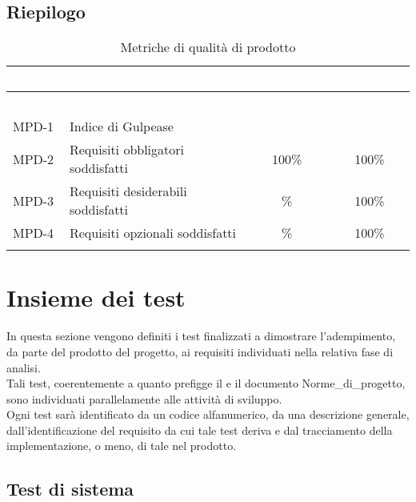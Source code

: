 \subsection{Riepilogo}
{
\setlength{\tabcolsep}{10pt}
\renewcommand{\arraystretch}{1.5}
\begin{xltabular}{\textwidth}{| l | X | c | c |}
    \hline
     \textbf{\textcolor{white}{Codice}} & \textbf{\textcolor{white}{Nome}} & \textbf{\textcolor{white}{Accettabile}} & \textbf{\textcolor{white}{Preferibile}} \\
    \hline
    \endfirsthead
    \hline
     \textbf{\textcolor{white}{Codice}} & \textbf{\textcolor{white}{Nome}} & \textbf{\textcolor{white}{Accettabile}} & \textbf{\textcolor{white}{Preferibile}} \\ 
    \endhead
    MPD-1 & Indice di Gulpease &  &  \\
    \hline
    MPD-2 & Requisiti obbligatori soddisfatti & 100\% & 100\% \\
    \hline
    MPD-3 & Requisiti desiderabili soddisfatti & \% & 100\% \\
    \hline
    MPD-4 & Requisiti opzionali soddisfatti & \% & 100\% \\
    \hline
     \caption{Metriche di qualità di prodotto}
    \label{tab:mpd}
\end{xltabular}
}

\section{Insieme dei test} \label{sec:test}
In questa sezione vengono definiti i test finalizzati a dimostrare l'adempimento, da parte del prodotto del progetto, ai requisiti individuati nella relativa fase di analisi.\\
Tali test, coerentemente a quanto prefigge il  e il documento Norme\_di\_progetto, sono individuati parallelamente alle attività di sviluppo.\\
Ogni test sarà identificato da un codice alfanumerico, da una descrizione generale, dall'identificazione del requisito da cui tale test deriva e dal tracciamento della implementazione, o meno, di tale nel prodotto.

\subsection{Test di sistema}

